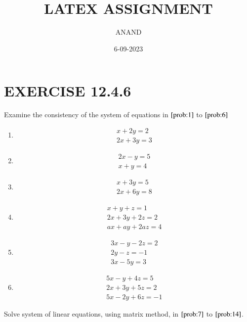 \documentclass{article}
\theoremstyle{remark}
\begin{document}
\title{LATEX ASSIGNMENT}
\author{ANAND}
\date{6-09-2023}
\maketitle
\section*{EXERCISE 12.4.6}
Examine the consistency of the system of equations in  $\ref{prob:1}$ to $\ref{prob:6}$
\begin{enumerate}
\item  \label{prob:1}
\begin{align}
 x+2y = 2\\
2x+3y = 3
\end{align}
\item
\begin{align}
 2x-y = 5\\
 x+y = 4
\end{align}
\item
\begin{align}
 x+3y = 5\\
 2x+6y= 8
\end{align}
\item
\begin{align}
 x+y+z = 1\\
 2x+3y+2z = 2\\
 ax+ay+2az = 4
\end{align}
\item
\begin{align}
 3x-y-2z = 2\\
 2y-z = -1\\
 3x-5y = 3
\end{align}
\item  \label{prob:6}
\begin{align}
 5x-y+4z = 5\\
 2x+3y+5z = 2\\
 5x-2y+6z = -1
\end{align}
\end{enumerate}
 Solve system of linear equations, using matrix method, in $\ref{prob:7}$ to $\ref{prob:14}$.
\end{document}
